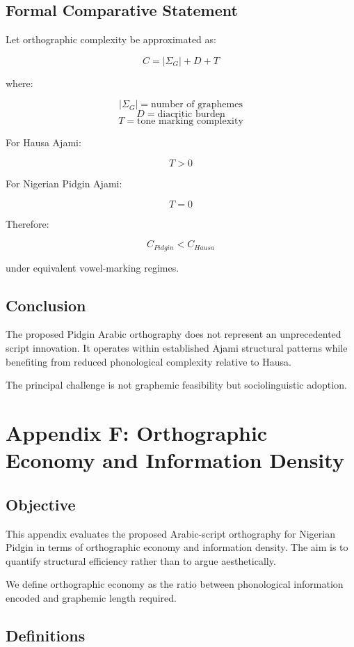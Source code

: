 \documentclass[12pt]{article}
\begin{document}
\subsection{Formal Comparative Statement}

Let orthographic complexity be approximated as:

\[
C = |\Sigma_G| + D + T
\]

where:

\[
|\Sigma_G| = \text{number of graphemes}
\]
\[
D = \text{diacritic burden}
\]
\[
T = \text{tone marking complexity}
\]

For Hausa Ajami:

\[
T > 0
\]

For Nigerian Pidgin Ajami:

\[
T = 0
\]

Therefore:

\[
C_{Pidgin} < C_{Hausa}
\]

under equivalent vowel-marking regimes.

\subsection{Conclusion}

The proposed Pidgin Arabic orthography does not represent an unprecedented script innovation. It operates within established Ajami structural patterns while benefiting from reduced phonological complexity relative to Hausa.

The principal challenge is not graphemic feasibility but sociolinguistic adoption.

\section{Appendix F: Orthographic Economy and Information Density}

\subsection{Objective}

This appendix evaluates the proposed Arabic-script orthography for Nigerian Pidgin in terms of orthographic economy and information density. The aim is to quantify structural efficiency rather than to argue aesthetically.

We define orthographic economy as the ratio between phonological information encoded and graphemic length required.

\subsection{Definitions}
\end{document}
